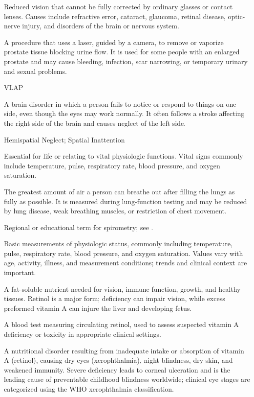  Reduced vision that cannot be fully corrected by ordinary glasses or contact lenses. Causes include refractive error, cataract, glaucoma, retinal disease, optic-nerve injury, and disorders of the brain or nervous system.

 A procedure that uses a laser, guided by a camera, to remove or vaporize prostate tissue blocking urine flow. It is used for some people with an enlarged prostate and may cause bleeding, infection, scar narrowing, or temporary urinary and sexual problems.

\synonyms
VLAP

 A brain disorder in which a person fails to notice or respond to things on one side, even though the eyes may work normally. It often follows a stroke affecting the right side of the brain and causes neglect of the left side.

\synonyms
Hemispatial Neglect; Spatial Inattention

 Essential for life or relating to vital physiologic functions. Vital signs commonly include temperature, pulse, respiratory rate, blood pressure, and oxygen saturation.

 The greatest amount of air a person can breathe out after filling the lungs as fully as possible. It is measured during lung-function testing and may be reduced by lung disease, weak breathing muscles, or restriction of chest movement.

 Regional or educational term for spirometry; see .

 Basic measurements of physiologic status, commonly including temperature, pulse, respiratory rate, blood
pressure, and oxygen saturation. Values vary with age, activity, illness, and measurement
conditions; trends and clinical context are important.

 A fat-soluble nutrient needed for vision, immune function, growth, and healthy tissues. Retinol is a major form; deficiency can impair vision, while excess preformed vitamin A can injure the liver and developing fetus.

 A blood test measuring circulating retinol, used to assess suspected vitamin A deficiency or toxicity in appropriate clinical settings.

 A nutritional disorder resulting from inadequate intake or absorption of vitamin A (retinol), causing dry eyes (xerophthalmia), night blindness, dry skin, and weakened immunity. Severe deficiency leads to corneal ulceration and is the leading cause of preventable childhood blindness worldwide; clinical eye stages are categorized using the WHO xerophthalmia classification.

